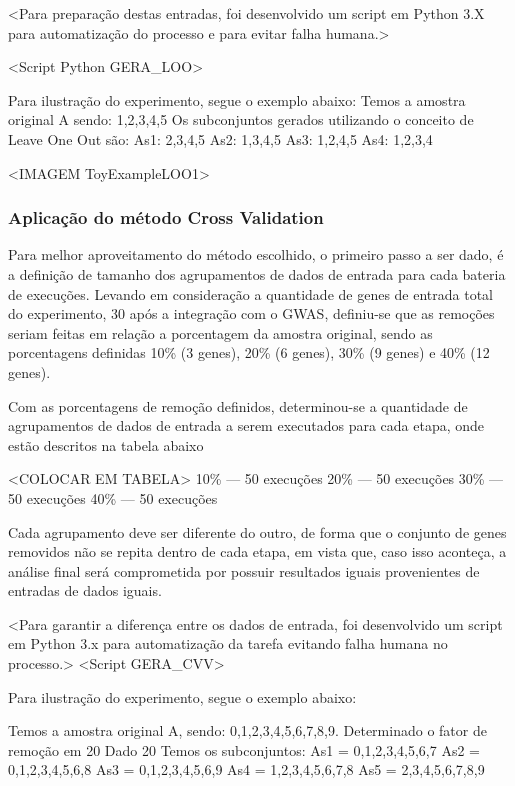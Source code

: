 <Para preparação destas entradas, foi desenvolvido um script em Python 3.X para automatização do processo e para evitar falha humana.>

<Script Python GERA_LOO>

Para ilustração do experimento, segue o exemplo abaixo:
Temos a amostra original A sendo: 1,2,3,4,5
Os subconjuntos gerados utilizando o conceito de Leave One Out são:
As1: 2,3,4,5
As2: 1,3,4,5
As3: 1,2,4,5
As4: 1,2,3,4

<IMAGEM ToyExampleLOO1>

\subsubsection{Aplicação do método Cross Validation}

Para melhor aproveitamento do método escolhido, o primeiro passo a ser dado, é a definição de tamanho dos agrupamentos de dados de entrada para cada bateria de execuções.
Levando em consideração a quantidade de genes de entrada total do experimento, 30 após a integração com o GWAS, definiu-se que as remoções seriam feitas em relação a porcentagem da amostra original, sendo as porcentagens definidas 10\% (3 genes), 20\% (6 genes), 30\% (9 genes) e 40\% (12 genes).

Com as porcentagens de remoção definidos, determinou-se a quantidade de agrupamentos de dados de entrada a serem executados para cada etapa, onde estão descritos na tabela abaixo

<COLOCAR EM TABELA>
10\% --- 50 execuções
20\% --- 50 execuções
30\% --- 50 execuções
40\% --- 50 execuções

Cada agrupamento deve ser diferente do outro, de forma que o conjunto de genes removidos não se repita dentro de cada etapa, em vista que, caso isso aconteça, a análise final será comprometida por possuir resultados iguais provenientes de entradas de dados iguais.

<Para garantir a diferença entre os dados de entrada, foi desenvolvido um script em Python 3.x para automatização da tarefa evitando falha humana no processo.>
<Script GERA_CVV>

Para ilustração do experimento, segue o exemplo abaixo:

Temos a amostra original A, sendo: 0,1,2,3,4,5,6,7,8,9.
Determinado o fator de remoção em 20%
Dado 20%
Temos os subconjuntos:
As1 = 0,1,2,3,4,5,6,7
As2 = 0,1,2,3,4,5,6,8
As3 = 0,1,2,3,4,5,6,9
As4 = 1,2,3,4,5,6,7,8
As5 = 2,3,4,5,6,7,8,9

